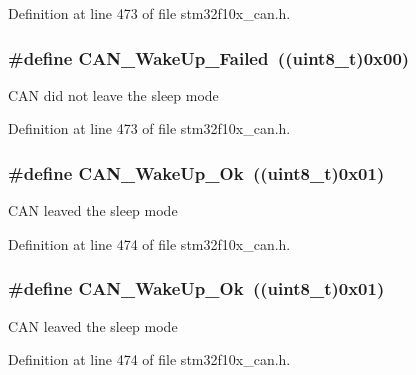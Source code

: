 Definition at line 473 of file stm32f10x\+\_\+can.\+h.

\subsubsection[{\texorpdfstring{C\+A\+N\+\_\+\+Wake\+Up\+\_\+\+Failed}{CAN_WakeUp_Failed}}]{\setlength{\rightskip}{0pt plus 5cm}\#define C\+A\+N\+\_\+\+Wake\+Up\+\_\+\+Failed~(({\bf uint8\+\_\+t})0x00)}\hypertarget{group___c_a_n__wake__up__constants_ga837fd7ad47fee78e43a186544e2b390b}{}\label{group___c_a_n__wake__up__constants_ga837fd7ad47fee78e43a186544e2b390b}
C\+AN did not leave the sleep mode 

Definition at line 473 of file stm32f10x\+\_\+can.\+h.

\subsubsection[{\texorpdfstring{C\+A\+N\+\_\+\+Wake\+Up\+\_\+\+Ok}{CAN_WakeUp_Ok}}]{\setlength{\rightskip}{0pt plus 5cm}\#define C\+A\+N\+\_\+\+Wake\+Up\+\_\+\+Ok~(({\bf uint8\+\_\+t})0x01)}\hypertarget{group___c_a_n__wake__up__constants_ga152e4935cf85bdfb803eb36b656cd690}{}\label{group___c_a_n__wake__up__constants_ga152e4935cf85bdfb803eb36b656cd690}
C\+AN leaved the sleep mode 

Definition at line 474 of file stm32f10x\+\_\+can.\+h.

\subsubsection[{\texorpdfstring{C\+A\+N\+\_\+\+Wake\+Up\+\_\+\+Ok}{CAN_WakeUp_Ok}}]{\setlength{\rightskip}{0pt plus 5cm}\#define C\+A\+N\+\_\+\+Wake\+Up\+\_\+\+Ok~(({\bf uint8\+\_\+t})0x01)}\hypertarget{group___c_a_n__wake__up__constants_ga152e4935cf85bdfb803eb36b656cd690}{}\label{group___c_a_n__wake__up__constants_ga152e4935cf85bdfb803eb36b656cd690}
C\+AN leaved the sleep mode 

Definition at line 474 of file stm32f10x\+\_\+can.\+h.

